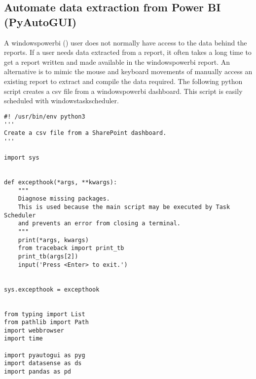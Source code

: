 \documentclass[10pt, letterpaper, twoside]{article}
\begin{document}
\subsection{Automate data extraction from Power BI (PyAutoGUI)}\label{sec:automate_data_extraction_from_power_bi}
A \Gls{windowspowerbi} (\cite{windowspowerbi}) user does not normally have access to the data behind the reports. If a user needs data extracted from a report, it often takes a long time to get a report written and made available in the \Gls{windowspowerbi} report. An alternative is to mimic the mouse and keyboard movements of manually access an existing report to extract and compile the data required. The following \Gls{python} script creates a csv file from a \Gls{windowspowerbi} dashboard. This script is easily scheduled with \Gls{windowstaskscheduler}.
\begin{footnotesize}
\begin{verbatim}
#! /usr/bin/env python3
'''
Create a csv file from a SharePoint dashboard.
'''

import sys


def excepthook(*args, **kwargs):
    """
    Diagnose missing packages.
    This is used because the main script may be executed by Task Scheduler
    and prevents an error from closing a terminal.
    """
    print(*args, kwargs)
    from traceback import print_tb
    print_tb(args[2])
    input('Press <Enter> to exit.')


sys.excepthook = excepthook


from typing import List
from pathlib import Path
import webbrowser
import time

import pyautogui as pyg
import datasense as ds
import pandas as pd



\end{verbatim}
\end{footnotesize}
\end{document}
